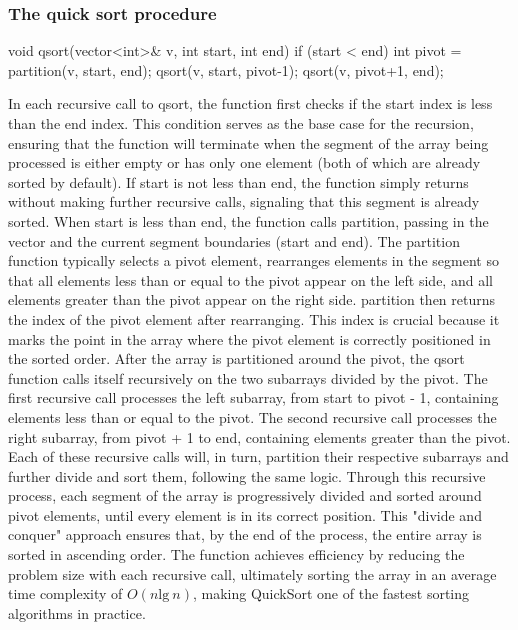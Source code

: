 \documentclass{report}
\begin{document}
\bigbreak \noindent 
\subsubsection{The quick sort procedure}
\bigbreak \noindent 
\begin{cppcode}
void qsort(vector<int>& v, int start, int end) {
    if (start < end) {
        int pivot = partition(v, start, end);
        qsort(v, start, pivot-1);
        qsort(v, pivot+1, end);
    }
}
\end{cppcode}
\bigbreak \noindent 
In each recursive call to qsort, the function first checks if the start index is less than the end index. This condition serves as the base case for the recursion, ensuring that the function will terminate when the segment of the array being processed is either empty or has only one element (both of which are already sorted by default). If start is not less than end, the function simply returns without making further recursive calls, signaling that this segment is already sorted.
\bigbreak \noindent 
When start is less than end, the function calls partition, passing in the vector and the current segment boundaries (start and end). The partition function typically selects a pivot element, rearranges elements in the segment so that all elements less than or equal to the pivot appear on the left side, and all elements greater than the pivot appear on the right side. partition then returns the index of the pivot element after rearranging. This index is crucial because it marks the point in the array where the pivot element is correctly positioned in the sorted order.
\bigbreak \noindent 
After the array is partitioned around the pivot, the qsort function calls itself recursively on the two subarrays divided by the pivot. The first recursive call processes the left subarray, from start to pivot - 1, containing elements less than or equal to the pivot. The second recursive call processes the right subarray, from pivot + 1 to end, containing elements greater than the pivot. Each of these recursive calls will, in turn, partition their respective subarrays and further divide and sort them, following the same logic.
\bigbreak \noindent 
Through this recursive process, each segment of the array is progressively divided and sorted around pivot elements, until every element is in its correct position. This "divide and conquer" approach ensures that, by the end of the process, the entire array is sorted in ascending order. The function achieves efficiency by reducing the problem size with each recursive call, ultimately sorting the array in an average time complexity of $O(n\text{lg}\ n)$, making QuickSort one of the fastest sorting algorithms in practice.
\end{document}

